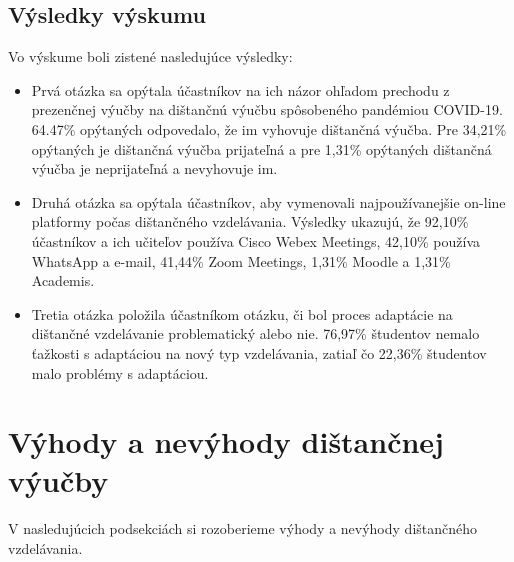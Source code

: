 \documentclass[10pt,oneside,slovak,a4paper]{article}
\begin{document}
\subsection{Výsledky výskumu}%
Vo výskume boli zistené nasledujúce výsledky\cite{covid19}: %
\begin{itemize}
	
	\item Prvá otázka sa opýtala účastníkov na ich názor ohľadom prechodu z prezenčnej výučby na dištančnú výučbu spôsobeného pandémiou COVID-19. 64.47\% opýtaných odpovedalo, že im vyhovuje dištančná výučba. Pre 34,21\% opýtaných je dištančná výučba prijateľná a pre 1,31\% opýtaných dištančná výučba je neprijateľná a nevyhovuje im.
	\item Druhá otázka sa opýtala účastníkov, aby vymenovali najpoužívanejšie on-line platformy počas dištančného vzdelávania. Výsledky ukazujú, že 92,10\% účastníkov a ich učiteľov používa Cisco Webex Meetings, 42,10\% používa WhatsApp a e-mail, 41,44\% Zoom Meetings, 1,31\% Moodle a 1,31\% Academis.
	\item Tretia otázka položila účastníkom otázku, či bol proces adaptácie na dištančné vzdelávanie problematický alebo nie. 76,97\% študentov nemalo ťažkosti s adaptáciou na nový typ vzdelávania, zatiaľ čo 22,36\% študentov malo problémy s adaptáciou.
\end{itemize}

\section{Výhody a nevýhody dištančnej výučby}
V nasledujúcich podsekciách si rozoberieme výhody a nevýhody dištančného vzdelávania\cite{Sokolova2018}. 
\end{document}
